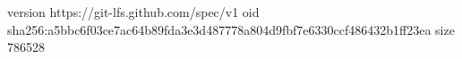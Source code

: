version https://git-lfs.github.com/spec/v1
oid sha256:a5bbc6f03ce7ac64b89fda3e3d487778a804d9fbf7e6330ccf486432b1ff23ea
size 786528
